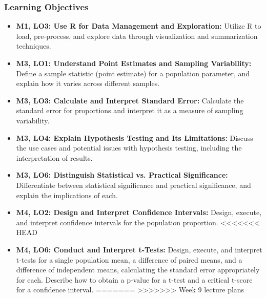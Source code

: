 \begin{frame}
    \frametitle{Learning Objectives}
    \begin{itemize}
        \item \textbf{M1, LO3: Use R for Data Management and Exploration:} Utilize R to load, pre-process, and explore data through visualization and summarization techniques.
        \item \textbf{M3, LO1: Understand Point Estimates and Sampling Variability:} Define a sample statistic (point estimate) for a population parameter, and explain how it varies across different samples.
        \item \textbf{M3, LO3: Calculate and Interpret Standard Error:} Calculate the standard error for proportions and interpret it as a measure of sampling variability.
        \item \textbf{M3, LO4: Explain Hypothesis Testing and Its Limitations:} Discuss the use cases and potential issues with hypothesis testing, including the interpretation of results.
        \item \textbf{M3, LO6: Distinguish Statistical vs. Practical Significance:} Differentiate between statistical significance and practical significance, and explain the implications of each.
        \item \textbf{M4, LO2: Design and Interpret Confidence Intervals:} Design, execute, and interpret confidence intervals for the population proportion.
<<<<<<< HEAD
        \item \textbf{M4, LO6: Conduct and Interpret t-Tests:} Design, execute, and interpret t-tests for a single population mean, a difference of paired means, and a difference of independent means, calculating the standard error appropriately for each. Describe how to obtain a p-value for a t-test and a critical t-score for a confidence interval.
=======
>>>>>>> Week 9 lecture plans
    \end{itemize}
\end{frame}
    
